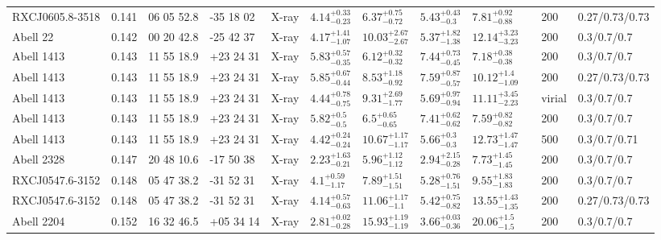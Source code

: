 \begin{landscape}
\begin{center}
{\begin{longtable}{llllllllllll}
RXCJ0605.8-3518 & 0.141 & 06 05 52.8 & -35 18 02 & X-ray & ${4.14}^{+0.33}_{-0.23}$ & ${6.37}^{+0.75}_{-0.72}$ & ${5.43}^{+0.43}_{-0.3}$ & ${7.81}^{+0.92}_{-0.88}$ & \citet{BA14.1} & 200 & 0.27/0.73/0.73 \\
Abell 22 & 0.142 & 00 20 42.8 & -25 42 37 & X-ray & ${4.17}^{+1.41}_{-1.07}$ & ${10.03}^{+2.67}_{-2.67}$ & ${5.37}^{+1.82}_{-1.38}$ & ${12.14}^{+3.23}_{-3.23}$ & \citet{ET11.1} & 200 & 0.3/0.7/0.7 \\
Abell 1413 & 0.143 & 11 55 18.9 & +23 24 31 & X-ray & ${5.83}^{+0.57}_{-0.35}$ & ${6.12}^{+0.32}_{-0.32}$ & ${7.44}^{+0.73}_{-0.45}$ & ${7.18}^{+0.38}_{-0.38}$ & \citet{ET11.1} & 200 & 0.3/0.7/0.7 \\
Abell 1413 & 0.143 & 11 55 18.9 & +23 24 31 & X-ray & ${5.85}^{+0.67}_{-0.44}$ & ${8.53}^{+1.18}_{-0.92}$ & ${7.59}^{+0.87}_{-0.57}$ & ${10.12}^{+1.4}_{-1.09}$ & \citet{BA14.1} & 200 & 0.27/0.73/0.73 \\
Abell 1413 & 0.143 & 11 55 18.9 & +23 24 31 & X-ray & ${4.44}^{+0.78}_{-0.75}$ & ${9.31}^{+2.69}_{-1.77}$ & ${5.69}^{+0.97}_{-0.94}$ & ${11.11}^{+3.45}_{-2.23}$ & \citet{SC07.1} & virial & 0.3/0.7/0.7 \\
Abell 1413 & 0.143 & 11 55 18.9 & +23 24 31 & X-ray & ${5.82}^{+0.5}_{-0.5}$ & ${6.5}^{+0.65}_{-0.65}$ & ${7.41}^{+0.62}_{-0.62}$ & ${7.59}^{+0.82}_{-0.82}$ & \citet{PO05.1} & 200 & 0.3/0.7/0.7 \\
Abell 1413 & 0.143 & 11 55 18.9 & +23 24 31 & X-ray & ${4.42}^{+0.24}_{-0.24}$ & ${10.67}^{+1.17}_{-1.17}$ & ${5.66}^{+0.3}_{-0.3}$ & ${12.73}^{+1.47}_{-1.47}$ & \citet{VI06.1} & 500 & 0.3/0.7/0.71 \\
Abell 2328 & 0.147 & 20 48 10.6 & -17 50 38 & X-ray & ${2.23}^{+1.63}_{-0.21}$ & ${5.96}^{+1.12}_{-1.12}$ & ${2.94}^{+2.15}_{-0.28}$ & ${7.73}^{+1.45}_{-1.45}$ & \citet{ET11.1} & 200 & 0.3/0.7/0.7 \\
RXCJ0547.6-3152 & 0.148 & 05 47 38.2 & -31 52 31 & X-ray & ${4.1}^{+0.59}_{-1.17}$ & ${7.89}^{+1.51}_{-1.51}$ & ${5.28}^{+0.76}_{-1.51}$ & ${9.55}^{+1.83}_{-1.83}$ & \citet{ET11.1} & 200 & 0.3/0.7/0.7 \\
RXCJ0547.6-3152 & 0.148 & 05 47 38.2 & -31 52 31 & X-ray & ${4.14}^{+0.57}_{-0.63}$ & ${11.06}^{+1.17}_{-1.1}$ & ${5.42}^{+0.75}_{-0.82}$ & ${13.55}^{+1.43}_{-1.35}$ & \citet{BA14.1} & 200 & 0.27/0.73/0.73 \\
Abell 2204 & 0.152 & 16 32 46.5 & +05 34 14 & X-ray & ${2.81}^{+0.02}_{-0.28}$ & ${15.93}^{+1.19}_{-1.19}$ & ${3.66}^{+0.03}_{-0.36}$ & ${20.06}^{+1.5}_{-1.5}$ & \citet{ET11.1} & 200 & 0.3/0.7/0.7 \\

\end{longtable}}
\end{center}
\end{landscape}
